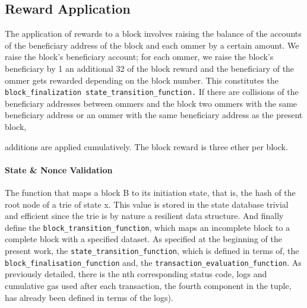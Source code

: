 \documentclass[10pt,letterpaper,leqno,bibliography=totoc]{scrartcl}
\newenvironment{alphafootnotes}
{\par\edef\savedfootnotenumber{\number\value{footnote}}
\renewcommand{\thefootnote}{\alph{footnote}}
\setcounter{footnote}{0}}
{\par\setcounter{footnote}{\savedfootnotenumber}}
\begin{document}
\begin{alphafootnotes}
\begin{multicols*}{2}
		\subsection{Reward Application} The application of rewards to a block involves raising the balance of the accounts of the beneficiary address of the block and each ommer by a certain amount. We raise the block’s beneficiary account; for each ommer, we raise the block’s beneficiary by 1 an additional 32 of the block reward and the beneficiary of the ommer gets rewarded depending on the block number. This constitutes the \texttt{block\_finalization state\_transition\_function.} If there are collisions of the beneficiary addresses between ommers and the block two ommers with the same beneficiary address or an ommer with the same beneficiary address as the present block,

			additions are applied cumulatively. The block reward is three ether per block. 
			
			\paragraph{State \& Nonce Validation} The function that maps a block B to its initiation state, that is, the hash of the root node of a trie of state x. This value is stored in the state database trivial and efficient since the trie is by nature a resilient data structure. And finally define the \texttt{block\_transition\_function}, which maps an incomplete block to a complete block with a specified dataset. As specified at the beginning of the present work, the \texttt{state\_transition\_function}, which is defined in terms of, the \texttt{block\_finalisation\_function} and, the \texttt{transaction\_evaluation\_function}. As previously detailed, there is the nth corresponding status code, logs and cumulative gas used after each transaction, the fourth component in the tuple, has already been defined in terms of the logs). 

\end{multicols*}
\end{alphafootnotes}
\end{document}
